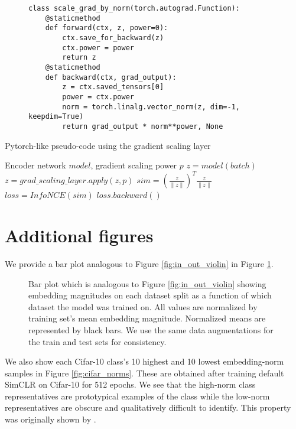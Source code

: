 \begin{figure}
    \begin{lstlisting}[caption={PyTorch code for gradient scaling layer}, label={alg:grad_scaling}]
class scale_grad_by_norm(torch.autograd.Function):
    @staticmethod
    def forward(ctx, z, power=0):
        ctx.save_for_backward(z)
        ctx.power = power
        return z
    @staticmethod
    def backward(ctx, grad_output):
        z = ctx.saved_tensors[0]
        power = ctx.power
        norm = torch.linalg.vector_norm(z, dim=-1, keepdim=True)
        return grad_output * norm**power, None
\end{lstlisting}
\end{figure}

\begin{algorithm}[tb]
   \caption{Pytorch-like pseudo-code using the gradient scaling layer}
   \label{alg:grad_scaling_use}
\begin{algorithmic}
    Encoder network $model$, gradient scaling power $p$
   \STATE $z = model(batch)$
   \STATE $z = grad\_scaling\_layer.apply(z, p)$
   \STATE $sim = (\frac{z}{\|z\|})^T \frac{z}{\|z\|}$
   \STATE $loss = InfoNCE(sim)$
   \STATE $loss.backward()$
\end{algorithmic}
\end{algorithm}


\section{Additional figures}
We provide a bar plot analogous to Figure \ref{fig:in_out_violin} in Figure \ref{fig:in_out_distribution_norms}.

\begin{figure}
    \centering
    \caption{Bar plot which is analogous to Figure \ref{fig:in_out_violin} showing embedding magnitudes on each dataset split as a function of which dataset the model was trained on. All values are normalized by training set's mean embedding magnitude. Normalized means are represented by black bars. We use the same data augmentations for the train and test sets for consistency.}
    \label{fig:in_out_distribution_norms}
\end{figure}

We also show each Cifar-10 class's 10 highest and 10 lowest embedding-norm samples in Figure \ref{fig:cifar_norms}. These are obtained after training default SimCLR on Cifar-10 for 512 epochs. We see that the high-norm class representatives are prototypical examples of the class while the low-norm representatives are obscure and qualitatively difficult to identify. This property was originally shown by \citet{embed_norm_confidence_2}.

